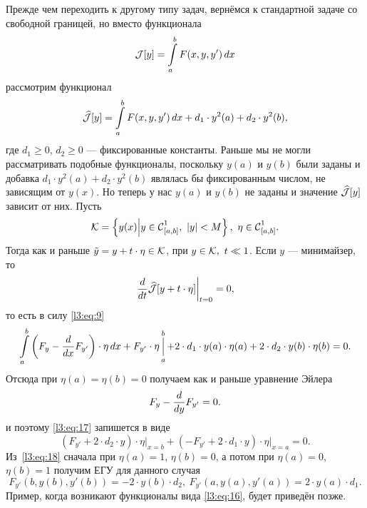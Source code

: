 Прежде чем переходить к другому типу задач, вернёмся к стандартной задаче со свободной границей, но вместо функционала
\begin{equation*}
	\mathcal{J}[y]=\int\limits_a^b F(x,y,y')\,dx
\end{equation*}
рассмотрим функционал
\begin{equation}
	\label{l3:eq:16}
	\widehat{\mathcal{J}}[y]=\int\limits_a^b F(x,y,y')\,dx+d_1\cdot y^2(a)+d_2\cdot y^2(b),
\end{equation}
где $d_1\geqslant0$, $d_2\geqslant0$ --- фиксированные константы. Раньше мы не могли рассматривать подобные функционалы, поскольку $y(a)$ и $y(b)$ были заданы и добавка $d_1\cdot y^2(a)+d_2\cdot y^2(b)$ являлась бы фиксированным числом, не зависящим от $y(x)$. Но теперь у нас $y(a)$ и $y(b)$ не заданы и значение $\widehat{\mathcal{J}}[y]$ зависит от них. Пусть
\begin{equation*}
	\K=\left\{y(x)\middle|y\in\Cfn[{[a,b]}]{1},\ |y|<M\right\},\ \eta\in\Cfn[{[a,b]}]{1}.
\end{equation*}
Тогда как и раньше $\tilde{y}=y+t\cdot\eta\in\mathcal{K}$, при $y\in\mathcal{K},\ t\ll1$. Если $y$ --- минимайзер, то 
\begin{equation*}
	\left.\frac{d}{dt}\widehat{\mathcal{J}}[y+t\cdot\eta]\right|_{t=0}=0,
\end{equation*}
то есть в силу \eqref{l3:eq:9}
\begin{equation}
	\label{l3:eq:17}
	\int\limits_a^b\left(F_y-\frac{d}{dx}F_{y'}\right)\cdot\eta\,dx+F_{y'}\cdot\eta\mathop{\Big|}\limits_a^b+2\cdot d_1\cdot y(a)\cdot\eta(a)+2\cdot d_2\cdot y(b)\cdot\eta(b)=0.
\end{equation}
Отсюда при $\eta(a)=\eta(b)=0$ получаем как и раньше уравнение Эйлера
\begin{equation*}
	 F_y-\frac{d}{dy}F_{y'}=0.
\end{equation*}
и поэтому \eqref{l3:eq:17} запишется в виде 
\begin{equation}
	\label{l3:eq:18}
	\left(F_{y'}+2\cdot d_2\cdot y\right)\cdot\eta\Big|_{x=b}+\left(-F_{y'}+2\cdot d_1\cdot y\right)\cdot\eta\Big|_{x=a}=0.
\end{equation}
Из~\eqref{l3:eq:18} сначала при $\eta(a)=1$, $\eta(b)=0$, а потом при $\eta(a)=0$, $\eta(b)=1$ получим ЕГУ для данного случая
\begin{equation}
	\label{l3:eq:19}
	 F_{y'}(b,y(b),y'(b))=-2\cdot y(b)\cdot d_2,\ F_{y'}(a,y(a),y'(a))=2\cdot y(a)\cdot d_1.
\end{equation}
Пример, когда возникают функционалы вида \eqref{l3:eq:16}, будет приведён позже.

